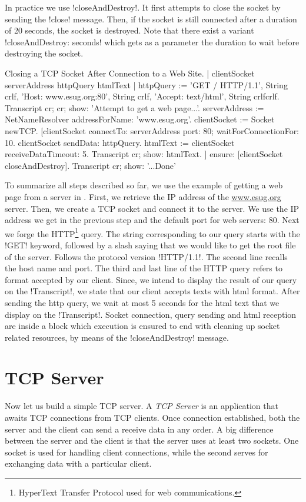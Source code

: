 \documentclass[a4paper,10pt,twoside]{book}
\begin{document}
In practice we use \ct!closeAndDestroy!. It first attempts to close the socket by sending the \ct!close! message.
Then, if the socket is still connected after a duration of 20 seconds, the socket is destroyed.
Note that there exist a variant \ct!closeAndDestroy: seconds! which gets as a parameter the duration to wait before destroying the socket.

\begin{script}{Closing a TCP Socket After Connection to a Web Site.}
| clientSocket serverAddress httpQuery htmlText |
httpQuery := 'GET / HTTP/1.1', String crlf, 
	'Host: www.esug.org:80', String crlf, 
	'Accept: text/html', String crlfcrlf.
Transcript cr; cr; show: 'Attempt to get a web page...'.
serverAddress := NetNameResolver addressForName: 'www.esug.org'.
clientSocket := Socket newTCP.
[clientSocket 
	connectTo: serverAddress port: 80;
	waitForConnectionFor: 10.
 clientSocket sendData: httpQuery.
 htmlText  := clientSocket receiveDataTimeout: 5.
 Transcript cr; show: htmlText.
] ensure: [clientSocket closeAndDestroy].
Transcript cr; show: '...Done'
\end{script}

To summarize all steps described so far, we use the example of getting a web page from a server in .
First, we retrieve the IP address of the \url{www.esug.org} server.
Then, we create a TCP socket and connect it to the server.
We use the IP address we get in the previous step and the default port for web servers: 80.
Next we forge the HTTP\footnote{HyperText Transfer Protocol used for web communications.} query.
The string corresponding  to our query starts with the \ct!GET! keyword, followed by a slash saying that we would like to get the root file of the server.
Follows the protocol version \ct!HTTP/1.1!.
The second line recalls the host name and port.
The third and last line of the HTTP query refers to format accepted by our client. 
Since, we intend to display the result of our query on the \ct!Transcript!, we state that our client accepts texts with html format.
After sending the http query, we wait at most 5 seconds for the html text that we display on the \ct!Transcript!.
Socket connection, query sending and html reception are inside a block which execution is ensured to end with cleaning up socket related resources, by means of the \ct!closeAndDestroy! message.

\section{TCP Server}
\label{sec:serverTcpSocket}
Now let us build a simple TCP server. A \textit{TCP Server} is an application that awaits TCP connections from TCP clients. Once connection established, both the server and the client can send a receive data in any order. 
A big difference between the server and the client is that the server uses at least two sockets.
One socket is used for handling client connections, while the second serves for exchanging data with a particular client.
\end{document}
